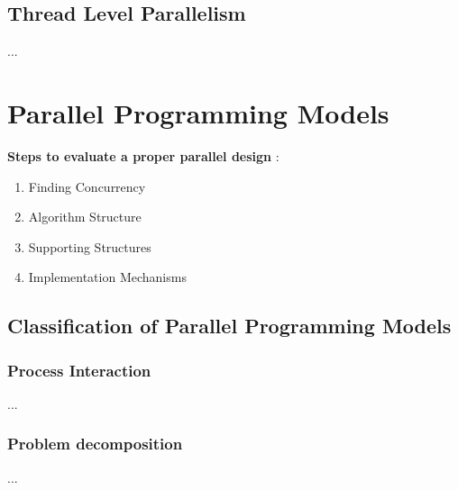\subsection{Thread Level Parallelism}

...\parencite[see][p24]{book1}

\section{Parallel Programming Models}

\textbf{Steps to evaluate a proper parallel design} \parencite[see][p6]{article6}:
\begin{enumerate}
	\item Finding Concurrency
	\item Algorithm Structure
	\item Supporting Structures
	\item Implementation Mechanisms
\end{enumerate}

\newpage

\subsection{Classification of Parallel Programming Models}

\subsubsection{Process Interaction}

...\parencite[see][p4]{internet1}

\subsubsection{Problem decomposition}

...\parencite[see][p105 ff.]{book1}
